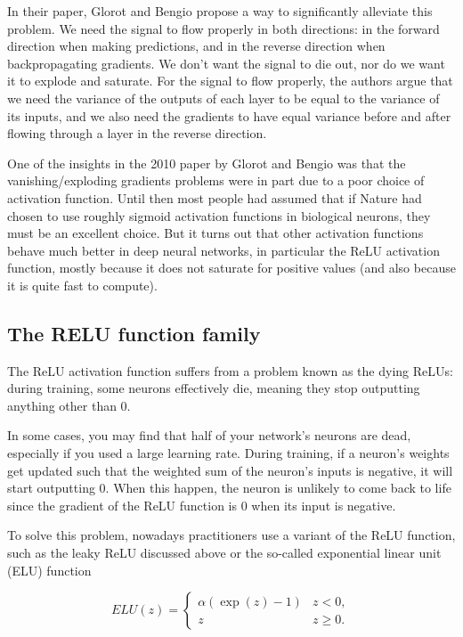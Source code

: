 \documentclass[%
oneside,                 %
final,                   %
10pt]{article}
\begin{document}
In their paper, Glorot and Bengio propose a way to significantly
alleviate this problem. We need the signal to flow properly in both
directions: in the forward direction when making predictions, and in
the reverse direction when backpropagating gradients. We don’t want
the signal to die out, nor do we want it to explode and saturate. For
the signal to flow properly, the authors argue that we need the
variance of the outputs of each layer to be equal to the variance of
its inputs, and we also need the gradients to have equal variance
before and after flowing through a layer in the reverse direction.

One of the insights in the 2010 paper by Glorot and Bengio was that
the vanishing/exploding gradients problems were in part due to a poor
choice of activation function. Until then most people had assumed that
if Nature had chosen to use roughly sigmoid activation functions in
biological neurons, they must be an excellent choice. But it turns out
that other activation functions behave much better in deep neural
networks, in particular the ReLU activation function, mostly because
it does not saturate for positive values (and also because it is quite
fast to compute).

\subsection{The RELU function family}

The ReLU activation function suffers from a problem known as the dying
ReLUs: during training, some neurons effectively die, meaning they
stop outputting anything other than 0.

In some cases, you may find that half of your network’s neurons are
dead, especially if you used a large learning rate. During training,
if a neuron’s weights get updated such that the weighted sum of the
neuron’s inputs is negative, it will start outputting 0. When this
happen, the neuron is unlikely to come back to life since the gradient
of the ReLU function is 0 when its input is negative.

To solve this problem, nowadays practitioners use a variant of the
ReLU function, such as the leaky ReLU discussed above or the so-called
exponential linear unit (ELU) function

\[
ELU(z) = \left\{\begin{array}{cc} \alpha\left( \exp{(z)}-1\right) & z < 0,\\  z & z \ge 0.\end{array}\right. 
\]
\end{document}
